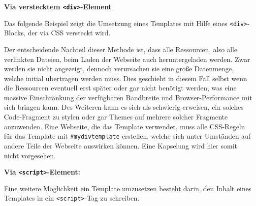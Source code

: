 \textbf{Via verstecktem \texttt{\textless{}div\textgreater{}}-Element}

Das folgende Beispiel zeigt die Umsetzung eines Templates mit Hilfe eines \texttt{\textless{}div\textgreater{}}-Blocks, der via CSS versteckt wird.

\begin{Shaded}
\begin{Highlighting}[]
\KeywordTok{>}
    \KeywordTok{>}
\end{Highlighting}
\end{Shaded}

Der entscheidende Nachteil dieser Methode ist, dass alle Ressourcen, also alle verlinkten Dateien, beim Laden der Webseite auch heruntergeladen werden. Zwar werden sie nicht angezeigt, dennoch verursachen sie eine große Datenmenge, welche initial übertragen werden muss. Dies geschieht in diesem Fall selbst wenn die Ressourcen eventuell erst später oder gar nicht benötigt werden, was eine massive Einschränkung der verfügbaren Bandbreite und Browser-Performance mit sich bringen kann. Des Weiteren kann es sich als schwierig erweisen, ein solches Code-Fragment zu stylen oder gar Themes auf mehrere solcher Fragmente anzuwenden. Eine Webseite, die das Template verwendet, muss alle CSS-Regeln für das Template mit \texttt{\#mydivtemplate} erstellen, welche sich unter Umständen auf andere Teile der Webseite auswirken können. Eine Kapselung wird hier somit nicht vorgesehen.

\textbf{Via \texttt{\textless{}script\textgreater{}}-Element:}

Eine weitere Möglichkeit ein Template umzusetzen besteht darin, den Inhalt eines Templates in ein \texttt{\textless{}script\textgreater{}}-Tag zu schreiben.

\begin{Shaded}
\begin{Highlighting}[]
\KeywordTok{>}
  \OperatorTok{<}\OperatorTok{>}
    \OperatorTok{<}\OperatorTok{=}\OperatorTok{>}
  \OperatorTok{<}
\OperatorTok{>}
\end{Highlighting}
\end{Shaded}

